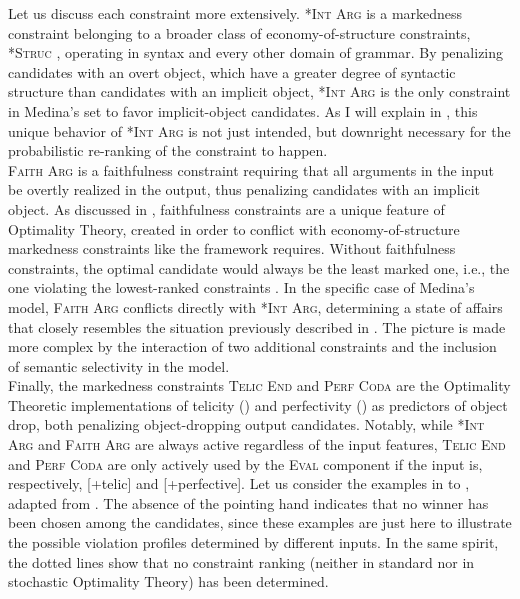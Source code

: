 Let us discuss each constraint more extensively. \textsc{*Int Arg} is a markedness constraint belonging to a broader class of economy-of-structure constraints, \textsc{*Struc} \parencite{buchwald2002recoverability, hartkemeyer2000ot}, operating in syntax and every other domain of grammar. By penalizing candidates with an overt object, which have a greater degree of syntactic structure than candidates with an implicit object, \textsc{*Int Arg} is the only constraint in Medina's set to favor implicit-object candidates. As I will explain in , this unique behavior of \textsc{*Int Arg} is not just intended, but downright necessary for the probabilistic re-ranking of the constraint to happen.\\
\textsc{Faith Arg} is a faithfulness constraint requiring that all arguments in the input be overtly realized in the output, thus penalizing candidates with an implicit object. As discussed in , faithfulness constraints are a unique feature of Optimality Theory, created in order to conflict with economy-of-structure markedness constraints like the framework requires. Without faithfulness constraints, the optimal candidate would always be the least marked one, i.e., the one violating the lowest-ranked constraints \parencite[3]{legendre2001introduction}. In the specific case of Medina's model, \textsc{Faith Arg} conflicts directly with \textsc{*Int Arg}, determining a state of affairs that closely resembles the situation previously described in . The picture is made more complex by the interaction of two additional constraints and the inclusion of semantic selectivity in the model.\\
Finally, the markedness constraints \textsc{Telic End} and \textsc{Perf Coda} are the Optimality Theoretic implementations of telicity () and perfectivity () as predictors of object drop, both penalizing object-dropping output candidates. Notably, while \textsc{*Int Arg} and \textsc{Faith Arg} are always active regardless of the input features, \textsc{Telic End} and \textsc{Perf Coda} are only actively used by the \textsc{Eval} component if the input is, respectively, [+telic] and [+perfective]. Let us consider the examples in  to , adapted from \textcite{Medina2007}. The absence of the pointing hand indicates that no winner has been chosen among the candidates, since these examples are just here to illustrate the possible violation profiles determined by different inputs. In the same spirit, the dotted lines show that no constraint ranking (neither in standard nor in stochastic Optimality Theory) has been determined.\\
